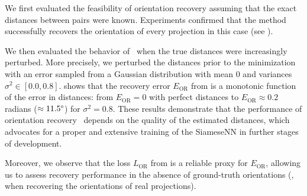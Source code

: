 We first evaluated the feasibility of orientation recovery assuming that the exact distances between pairs were known.
Experiments confirmed that the method successfully recovers the orientation of every projection in this case (see ).

We then evaluated the behavior of~ when the true distances were increasingly perturbed.
More precisely, we perturbed the distances prior to the minimization with an error sampled from a Gaussian distribution with mean $0$ and variances $\sigma^2 \in [0.0, 0.8]$.
 shows that the recovery error $E_\text{OR}$ from  is a monotonic function of the error in distances: from $E_\text{OR} = 0$ with perfect distances to $E_\text{OR} \approx 0.2$ radians ($\approx 11.5\degree$) for $\sigma^2 = 0.8$.
These results demonstrate that the performance of orientation recovery~ depends on the quality of the estimated distances, which advocates for a proper and extensive training of the SiameseNN in further stages of development.

Moreover, we observe that the loss $L_\text{OR}$ from  is a reliable proxy for $E_\text{OR}$, allowing us to assess recovery performance in the absence of ground-truth orientations (\ie, when recovering the orientations of real projections).

